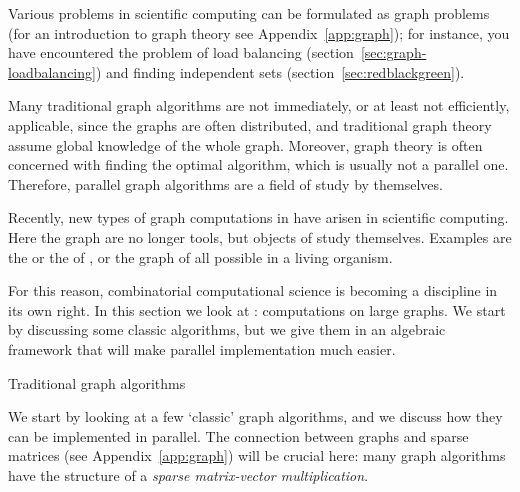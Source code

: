 \label{sec:graph-analytics}

Various problems in scientific computing can be formulated as graph
problems (for
an introduction to graph theory see Appendix~\ref{app:graph}); for
instance, you have 
encountered the problem of load
balancing (section~\ref{sec:graph-loadbalancing}) and finding
independent sets (section~\ref{sec:redblackgreen}).

Many traditional graph algorithms are
not immediately, or at least not efficiently, applicable, since the
graphs are often distributed, and traditional graph theory assume global
knowledge of the whole graph. Moreover, graph theory is often concerned
with finding the optimal algorithm, which is usually not a parallel one.
Therefore, parallel graph algorithms are a field of study by themselves.

Recently, new types of graph computations in have arisen in scientific
computing. Here the graph are no longer tools, but objects of study
themselves. Examples are the  or the
 of , or the graph
of all possible  in a living organism.

For this reason, combinatorial computational
science is becoming a discipline in its own right.
In this section we look at :
computations on large graphs. We start by discussing some classic
algorithms, but we give them in an algebraic framework that will
make parallel implementation much easier.

 {Traditional graph algorithms}
\label{sec:graph-alg}

We start by looking at a few `classic' graph algorithms, and we
discuss how they can be implemented in parallel. The connection
between graphs and sparse matrices (see Appendix~\ref{app:graph}) will
be crucial here: many graph algorithms have the structure of
a \emph{sparse matrix-vector
multiplication}.

